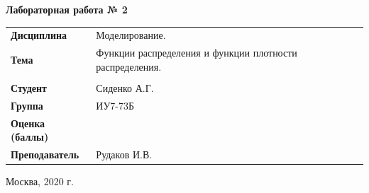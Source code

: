 \documentclass[a4paper,14pt]{extreport} %
\begin{document}
\begin{titlepage}
    \vspace{2cm}

    \begin{center}
        \textbf{Лабораторная работа № 2} \\
        \vspace{0.5cm}
    \end{center}

    \vspace{4cm}

    \begin{flushleft}
        \begin{tabular}{ll}
            \textbf{Дисциплина} & Моделирование.  \\
            \textbf{Тема} & Функции распределения и функции плотности распределения.  \\
            \\
            \textbf{Студент} & Сиденко А.Г. \\
            \textbf{Группа} & ИУ7-73Б \\
            \textbf{Оценка (баллы)} & \\
            \textbf{Преподаватель} & Рудаков И.В.   \\
        \end{tabular}
    \end{flushleft}

    \vspace{4cm}

   \begin{center}
        Москва, 2020 г.
    \end{center}

\end{titlepage}
\end{document}
